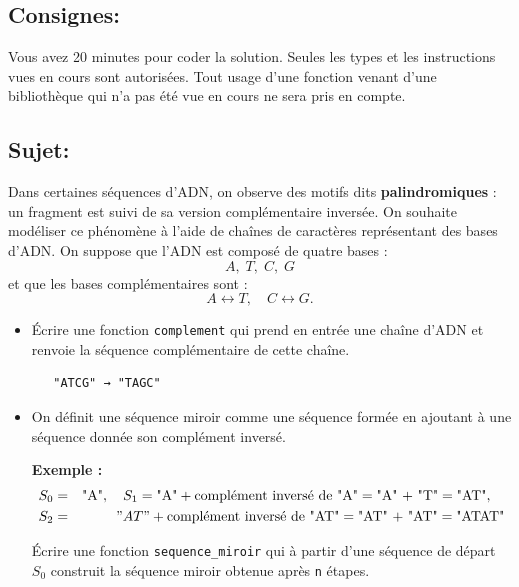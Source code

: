 \documentclass[a4paper,11pt]{article}
\begin{document}
\vspace*{-0.4 cm}
\subsection*{Consignes:} Vous avez 20 minutes pour coder la solution. Seules les types et les instructions vues en cours sont autorisées. Tout usage d'une fonction 
venant d'une bibliothèque qui n'a pas été vue en cours ne sera pris en compte. 

\vspace*{-0.2 cm}

\subsection*{Sujet:}   

Dans certaines séquences d'ADN, on observe des motifs dits \textbf{palindromiques} :
un fragment est suivi de sa version complémentaire inversée.  
On souhaite modéliser ce phénomène à l’aide de chaînes de caractères représentant des bases d’ADN.
On suppose  que l’ADN est composé de quatre bases :
\vspace*{-0.2 cm}
\[
A, \; T, \; C, \; G
\]
et que les bases complémentaires sont :
\[
A \leftrightarrow T, \quad C \leftrightarrow G.
\]

\begin{itemize}
\item[1.]  Écrire une fonction \texttt{complement} qui prend en entrée  une chaîne d'ADN et renvoie la séquence complémentaire de cette chaîne. 
\vspace*{-0.2 cm}
\begin{verbatim}
   "ATCG" → "TAGC"
\end{verbatim}

\vspace*{-0.2 cm}

\item[2.]  On définit une séquence miroir comme une séquence formée en ajoutant à une séquence donnée
son complément inversé.

\textbf{Exemple :}
\vspace*{-0.2 cm}
\begin{eqnarray*}
S_0 &= &\text{"A"}, \quad S_1 = \text{"A"} + \text{complément inversé de "A"} = \text{"A" + "T"} = \text{"AT"}, \quad \\
S_2 &=& "AT" + \text{complément inversé de "AT"} = \text{"AT" + "AT"} = \text{"ATAT"}
\end{eqnarray*}

Écrire une fonction \texttt{sequence\_miroir} qui à  partir d'une séquence de départ $S_0$ construit la séquence miroir obtenue après \texttt{n} étapes.
\end{itemize}
   
\end{document}
